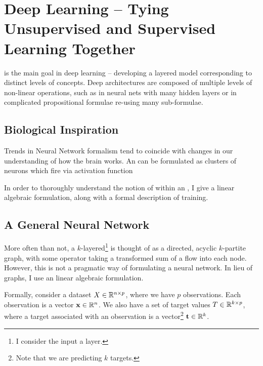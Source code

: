 
\chapter{Deep Learning -- Tying Unsupervised and Supervised Learning Together}

 is the main goal in deep learning -- developing a layered model corresponding to distinct levels of concepts. Deep architectures are composed of multiple levels of non-linear operations, such as in neural nets with many hidden layers or in complicated propositional formulae re-using many sub-formulae\citep{Bengio2009LearningDeep}.

\section{Biological Inspiration}

Trends in Neural Network formalism tend to coincide with changes in our understanding of how the brain works. An \ann can be formulated as clusters of neurons which fire via activation function

In order to thoroughly understand the notion of \dl{} within an \ann{}, I give a linear algebraic formulation, along with a formal description of training.

\section{A General Neural Network}

More often than not, a $k$-layered\footnote{I consider the input a layer.} \ann{} is thought of as a directed, acyclic $k$-partite graph, with some operator taking a transformed sum of a flow into each node. However, this is not a pragmatic way of formulating a neural network. In lieu of graphs, I use an  linear algebraic formulation. 

Formally, consider a dataset $X\in\mathbb{R}^{n\times p}$, where we have $p$ observations. Each observation is a vector $\mathbf{x}\in\mathbb{R}^n$. We also have a set of target values $T\in\mathbb{R}^{k\times p}$, where a target associated with an observation is a vector\footnote{Note that we are predicting $k$ targets.} $\mathbf{t}\in\mathbb{R}^k$.

